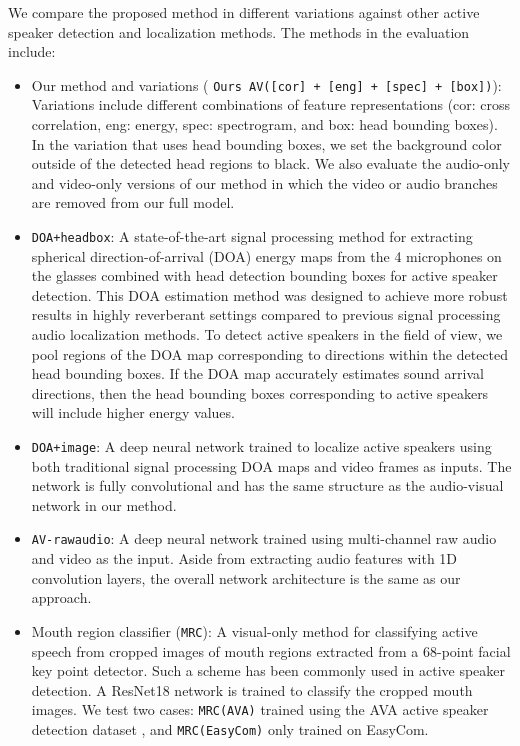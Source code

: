 \documentclass[10pt,twocolumn,letterpaper]{article}
\begin{document}
We compare the proposed method in different variations against other active speaker detection and localization methods.
The methods in the evaluation include:
\begin{itemize}
\vspace{-8pt}		
	\item  Our method and variations (
		\texttt{Ours AV([cor] + [eng] + [spec] + [box])}):
		Variations include different combinations of feature representations (cor: cross correlation, eng: energy, spec: spectrogram, 
		and box: head bounding boxes).
		In the variation that uses head bounding boxes, we set the background color outside of the detected head regions to black.
		We also evaluate the audio-only and video-only versions of our method 
		in which the video or audio branches are removed from our full model.

\vspace{-8pt}		
	\item \texttt{DOA+headbox}: A state-of-the-art signal processing method \cite{doa} for extracting spherical 
direction-of-arrival (DOA) energy maps from the 4 microphones on
the glasses combined with head detection bounding boxes for active speaker detection. 
This DOA estimation method was designed to achieve more robust results in 
highly reverberant settings compared to previous signal processing audio localization methods.
To detect active speakers in the field of view, we pool regions of the DOA map 
corresponding to directions within the detected head bounding boxes. 
If the DOA map accurately estimates sound arrival directions, 
then the 
head bounding boxes corresponding to active speakers will include higher energy values. 

\vspace{-8pt}
\item \texttt{DOA+image}: A deep neural network trained to localize active speakers
using both traditional signal processing DOA maps \cite{doa} 
and video frames as inputs. 
		The network is fully convolutional and has the same structure as the audio-visual network in our method.

\vspace{-8pt}	
\item \texttt{AV-rawaudio}: A deep neural network trained using multi-channel raw audio and video as the input.
		Aside from extracting audio features with 1D convolution layers, 
		the overall network architecture is the same as our approach.
\vspace{-8pt}
	\item Mouth region classifier (\texttt{MRC}): A visual-only method for classifying active speech 
	from cropped images of mouth regions extracted from a 68-point facial key point detector.
Such a scheme has been commonly used in active speaker detection. 
		A ResNet18 network is trained to classify the cropped mouth images. We test two cases: \texttt{MRC(AVA)}
		trained using the AVA active speaker detection dataset \cite{avadataset}, and \texttt{MRC(EasyCom)} only trained on EasyCom.


\end{itemize}
\end{document}
